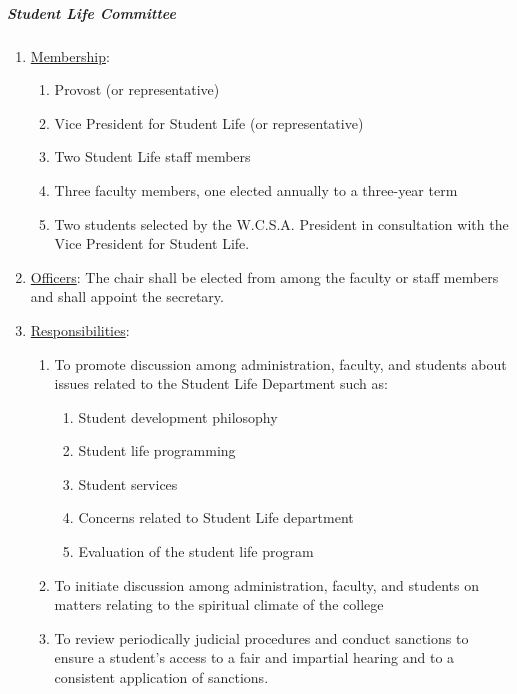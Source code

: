 				\subparagraph{Student Life Committee}
					\begin{enumerate}[label=\alph*)]
						\item{\underline{Membership}: 
							\begin{enumerate}[label=\arabic*)]
								\item{Provost (or representative)}
								\item{Vice President for Student Life (or representative)}
								\item{Two Student Life staff members}
								\item{Three faculty members, one elected annually to a three-year term}
								\item{Two students selected by the W.C.S.A. President in consultation with the Vice President for Student Life.}
							\end{enumerate}
						}
						\item{\underline{Officers}:
							The chair shall be elected from among the faculty or staff members and shall appoint the secretary.
						}
						\item{\underline{Responsibilities}:
							\begin{enumerate}[label=\arabic*)]
								\item{To promote discussion among administration, faculty, and students about issues related to the Student Life Department such as:
									\begin{enumerate}[label=(\alph*)]
										\item{Student development philosophy}
										\item{Student life programming}
										\item{Student services}
										\item{Concerns related to Student Life department}
										\item{Evaluation of the student life program}
									\end{enumerate}
								}
								\item{To initiate discussion among administration, faculty, and students on matters relating to the spiritual climate of the college}
								\item{To review periodically judicial procedures and conduct sanctions to ensure a student's access to a fair and impartial hearing and to a consistent application of sanctions.}
							\end{enumerate}
						}
					\end{enumerate}
